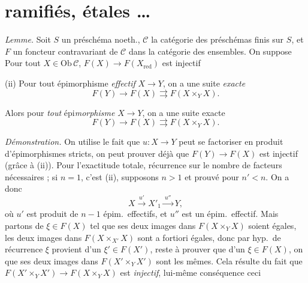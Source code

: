 \documentclass[11pt,a4paper]{article}
\begin{document}
\section*{  ramifiés, étales \ldots}



\emph{Lemme.} Soit $S$ un préschéma \struck{\ill{}} noeth., $\mathcal{C}$ la
catégorie des préschémas finis sur $S$, et $F$ un foncteur contravariant de
$\mathcal{C}$ dans la catégorie des ensembles. On suppose
Pour tout $X \in \mathrm{Ob}\,\mathcal{C}$,
$F(X) \to F(X_{\mathrm{red}})$ est injectif

(ii) Pour tout épimorphisme \emph{effectif} $X \to Y$, on a
une suite \emph{exacte}
\[
  F(Y) \to F(X) \rightrightarrows F(X \times_Y X) .
\]

Alors pour \emph{tout} épi\emph{morphisme} $X \to Y$, on a une suite exacte
\[
  F(Y) \to F(X) \rightrightarrows F(X \times_Y X) .
\]

\emph{Démonstration.} On utilise le fait que
$u : X \to Y$ peut
se factoriser en produit d'épimorphismes stricts, on peut
prouver déjà que $F(Y) \to F(X)$ est injectif (grâce à (ii)). Pour
l'exactitude totale, récurrence sur le nombre de facteurs nécessaires ; si
$n = 1$, c'est (ii), supposons $n > 1$ et prouvé pour $n' < n$. On a donc
\[
  X \xrightarrow{\ u'\ } X'_1 \xrightarrow{\ u''\ } Y ,
\]
où $u'$ est produit de $n - 1$ épim.\ effectifs, et $u''$ est un épim.\
effectif. Mais \ill{} partons de $\xi \in F(X)$ tel que ses deux
images dans $F(X \times_Y X)$ soient égales, les deux images dans
$F(X \times_{X'} X)$ sont a fortiori égales, donc par hyp.\ de
récurrence $\xi$ provient d'un $\xi' \in F(X')$, reste à prouver que
\ill{} \ill{} \uncertain{provient} d'un $\xi \in F(X)$, on \ill{} que ses deux images
dans $F(X' \times_Y X')$ sont les mêmes. Cela résulte du fait que
$F(X' \times_Y X') \to F(X \times_Y X)$ est \emph{injectif},
lui-même conséquence  ceci
\end{document}
